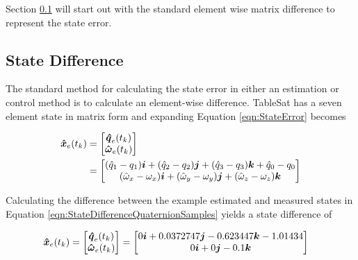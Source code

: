 Section \ref{subsec:StateDifference} will start out with the standard element wise matrix difference to represent the state error.

\subsection{State Difference}
\label{subsec:StateDifference}

The standard method for calculating the state error in either an estimation or control method is to calculate an element-wise difference.  TableSat has a seven element state in matrix form and expanding Equation \ref{eqn:StateError} becomes

\begin{equation}
  \begin{aligned}
    \boldsymbol{\hat{x}}_e(t_{k}) &= \begin{bmatrix}  \boldsymbol{\hat{q}}_e(t_{k}) \\ \boldsymbol{\hat{\omega}}_e(t_{k}) \\ \end{bmatrix} \\
    &= \begin{bmatrix} (\hat{q}_1 - q_{1}) \boldsymbol{i} + (\hat{q}_2 - q_{2}) \boldsymbol{j} + (\hat{q}_3 - q_{3}) \boldsymbol{k} + \hat{q}_0 - q_{0} \\ (\hat{\omega}_x - \omega_{x}) \boldsymbol{i} + (\hat{\omega}_y - \omega_{y}) \boldsymbol{j} + (\hat{\omega}_z - \omega_{z}) \boldsymbol{k} \end{bmatrix}
  \end{aligned}
  \label{eqn:StateDifference}
\end{equation}


Calculating the difference between the example estimated and measured states in Equation \ref{eqn:StateDifferenceQuaternionSamples} yields a state difference of

\begin{equation}
  \begin{aligned}
    \boldsymbol{\hat{x}}_e(t_{k})
    = \begin{bmatrix}  \boldsymbol{\hat{q}}_e(t_{k}) \\ \boldsymbol{\hat{\omega}}_e(t_{k}) \end{bmatrix}
    &= \begin{bmatrix} 0 \boldsymbol{i} +0.0372747 \boldsymbol{j} -0.623447 \boldsymbol{k} -1.01434 \\ 0 \boldsymbol{i} +0 \boldsymbol{j} -0.1 \boldsymbol{k} \end{bmatrix}
  \end{aligned}
  \label{eqn:StateDifferenceSample}
\end{equation}


